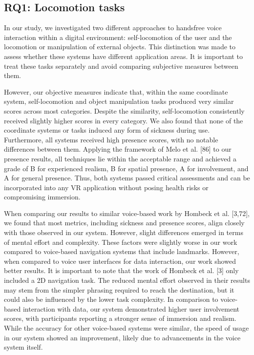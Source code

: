 \documentclass[preprint,12pt]{elsarticle}
\newcommand{\reftext}[1]{{\color{gray}#1}}   %
\begin{document}
\subsection{RQ1: Locomotion tasks}
\reftext{In our study, we investigated two different approaches to handsfree voice interaction within a digital environment: self-locomotion of the user and the locomotion or manipulation of external objects. This distinction was made to assess whether these systems have different application areas. It is important to treat these tasks separately and avoid comparing subjective measures between them.}

\reftext{However, our objective measures indicate that, within the same coordinate system, self-locomotion and object manipulation tasks produced very similar scores across most categories. Despite the similarity, self-locomotion consistently received slightly higher scores in every category. We also found that none of the coordinate systems or tasks induced any form of sickness during use. Furthermore, all systems received high presence scores, with no notable differences between them. Applying the framework of Melo et al. [86] to our presence results, all techniques lie within the acceptable range and achieved a grade of B for experienced realism, B for spatial presence, A for involvement, and A for general presence. Thus, both systems passed critical assessments and can be incorporated into any VR application without posing health risks or compromising immersion.}

\reftext{When comparing our results to similar voice-based work by Hombeck et al. [3,72], we found that most metrics, including sickness and presence scores, align closely with those observed in our system. However, slight differences emerged in terms of mental effort and complexity. These factors were slightly worse in our work compared to voice-based navigation systems that include landmarks. However, when compared to voice user interfaces for data interaction, our work showed better results. It is important to note that the work of Hombeck et al. [3] only included a 2D navigation task. The reduced mental effort observed in their results may stem from the simpler phrasing required to reach the destination, but it could also be influenced by the lower task complexity. In comparison to voice-based interaction with data, our system demonstrated higher user involvement scores, with participants reporting a stronger sense of immersion and realism. While the accuracy for other voice-based systems were similar, the speed of usage in our system showed an improvement, likely due to advancements in the voice system itself.}
\end{document}
